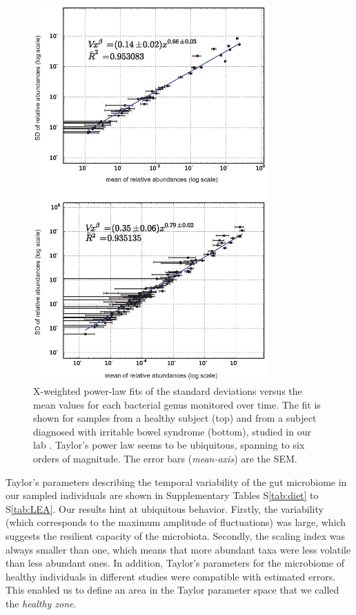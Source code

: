 \begin{figure}
	\centering
	\vspace*{-15mm} %
	\includegraphics[width=0.8\textwidth]{figs/Fig1.eps}
	\caption{X-weighted power-law fits of the standard deviations versus the mean values for each bacterial genus monitored over time. The fit is shown for samples from a healthy subject (top) and from a subject diagnosed with irritable bowel syndrome (bottom), studied in our lab \cite{IBS}. Taylor's power law seems to be ubiquitous, spanning to six orders of magnitude. The error bars (\emph{mean-axis}) are the SEM.}
	\label{fig:main1}
\end{figure}

Taylor's parameters describing the temporal variability of the gut microbiome in our sampled individuals are shown in Supplementary Tables S\ref{tab:diet} to S\ref{tab:LEA}. Our results hint at ubiquitous behavior. Firstly, the variability (which corresponds to the maximum amplitude of fluctuations) was large, which suggests the resilient capacity of the microbiota. Secondly, the scaling index was always smaller than one, which means that more abundant taxa were less volatile than less abundant ones. In addition, Taylor's parameters for the microbiome of healthy individuals in different studies were compatible with estimated errors. This enabled us to define an area in the Taylor parameter space that we called the \emph{healthy zone}. 

